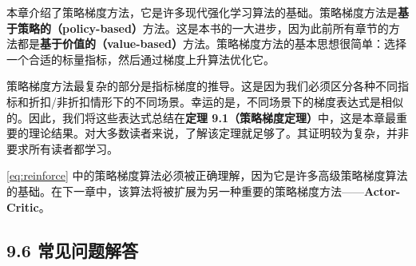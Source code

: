 \documentclass[UTF8]{article}
\begin{document}
本章介绍了策略梯度方法，它是许多现代强化学习算法的基础。策略梯度方法是\textbf{基于策略的（policy-based）}方法。这是本书的一大进步，因为此前所有章节的方法都是\textbf{基于价值的（value-based）}方法。策略梯度方法的基本思想很简单：选择一个合适的标量指标，然后通过梯度上升算法优化它。

策略梯度方法最复杂的部分是指标梯度的推导。这是因为我们必须区分各种不同指标和折扣/非折扣情形下的不同场景。幸运的是，不同场景下的梯度表达式是相似的。因此，我们将这些表达式总结在\textbf{定理 9.1（策略梯度定理）}中，这是本章最重要的理论结果。对大多数读者来说，了解该定理就足够了。其证明较为复杂，并非要求所有读者都学习。

\begin{remarkbox}
\eqref{eq:reinforce} 中的策略梯度算法必须被正确理解，因为它是许多高级策略梯度算法的基础。在下一章中，该算法将被扩展为另一种重要的策略梯度方法——\textbf{Actor-Critic}。
\end{remarkbox}

\subsection*{9.6 常见问题解答}
\end{document}
